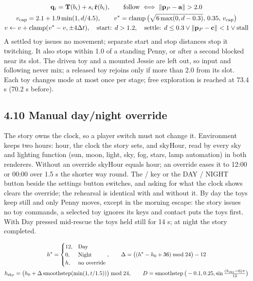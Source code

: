 \documentclass[12pt,a4paper]{article}
\begin{document}
{\small\begin{equation}\begin{gathered}
\mathbf q_i=\mathbf T(b_i)+s_i\,\hat{\mathbf r}(b_i),\qquad\text{follow}\iff\|\mathbf p_P-\mathbf a\|>2.0\\
v_{\rm cap}=2.1+1.9\min(1,d/4.5),\qquad v^\ast=\operatorname{clamp}\big(\sqrt{6\max(0,d-0.3)},\,0.35,\,v_{\rm cap}\big)\\
v\leftarrow v+\operatorname{clamp}(v^\ast-v,\pm4\Delta t),\quad\text{start: }d>1.2,\quad\text{settle: }d\le0.3\lor\|\mathbf p_P-\mathbf c\|<1\lor\text{stall}
\end{gathered}\label{eq:31}\end{equation}}
A settled toy issues no movement; separate start and stop distances stop it twitching. It also stops within 1.0 of a standing Penny, or after a second blocked near its slot. The driven toy and a mounted Jessie are left out, so input and following never mix; a released toy rejoins only if more than 2.0 from its slot. Each toy changes mode at most once per stage; free exploration is reached at 73.4 s (70.2 s before).

\subsection*{4.10 Manual day/night override}
The story owns the clock, so a player switch must not change it. Environment keeps two hours: hour, the clock the story sets, and skyHour, read by every sky and lighting function (sun, moon, light, sky, fog, stars, lamp automation) in both renderers. Without an override skyHour equals hour; an override eases it to 12:00 or 00:00 over 1.5 s the shorter way round. The / key or the DAY / NIGHT button beside the settings button switches, and asking for what the clock shows clears the override; the rehearsal is identical with and without it. By day the toys keep still and only Penny moves, except in the morning escape: the story issues no toy commands, a selected toy ignores its keys and contact puts the toys first. With Day pressed mid-rescue the toys held still for 14 s; at night the story completed.

{\small\begin{equation}\begin{gathered}
h^\ast=\begin{cases}12,&\text{Day}\\0,&\text{Night}\\h,&\text{no override}\end{cases},\qquad\Delta=\big((h^\ast-h_0+36)\bmod24\big)-12\\
h_{\rm sky}=\big(h_0+\Delta\operatorname{smoothstep}(\min(1,t/1.5))\big)\bmod24,\qquad D=\operatorname{smoothstep}\big(-0.1,0.25,\sin\tfrac{(h_{\rm sky}-6)\pi}{12}\big)
\end{gathered}\label{eq:32}\end{equation}}
\end{document}
